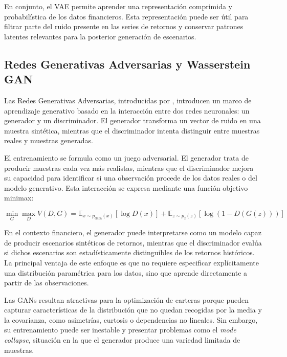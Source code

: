 En conjunto, el VAE permite aprender una representación comprimida y probabilística de los datos financieros. Esta representación puede ser útil para filtrar parte del ruido presente en las series de retornos y conservar patrones latentes relevantes para la posterior generación de escenarios.

\subsection{Redes Generativas Adversarias y Wasserstein GAN}

Las Redes Generativas Adversarias, introducidas por \cite{goodfellow2014generative}, introducen un marco de aprendizaje generativo basado en la interacción entre dos redes neuronales: un generador y un discriminador. El generador transforma un vector de ruido en una muestra sintética, mientras que el discriminador intenta distinguir entre muestras reales y muestras generadas.

El entrenamiento se formula como un juego adversarial. El generador trata de producir muestras cada vez más realistas, mientras que el discriminador mejora su capacidad para identificar si una observación procede de los datos reales o del modelo generativo. Esta interacción se expresa mediante una función objetivo minimax:

\begin{equation}
\min_G \max_D V(D,G)
=
\mathbb{E}_{x \sim p_{\text{data}}(x)}
\left[
\log D(x)
\right]
+
\mathbb{E}_{z \sim p_z(z)}
\left[
\log \left(1-D(G(z))\right)
\right]
\end{equation}

En el contexto financiero, el generador puede interpretarse como un modelo capaz de producir escenarios sintéticos de retornos, mientras que el discriminador evalúa si dichos escenarios son estadísticamente distinguibles de los retornos históricos. La principal ventaja de este enfoque es que no requiere especificar explícitamente una distribución paramétrica para los datos, sino que aprende directamente a partir de las observaciones.

Las GANs resultan atractivas para la optimización de carteras porque pueden capturar características de la distribución que no quedan recogidas por la media y la covarianza, como asimetrías, curtosis o dependencias no lineales. Sin embargo, su entrenamiento puede ser inestable y presentar problemas como el \textit{mode collapse}, situación en la que el generador produce una variedad limitada de muestras.

